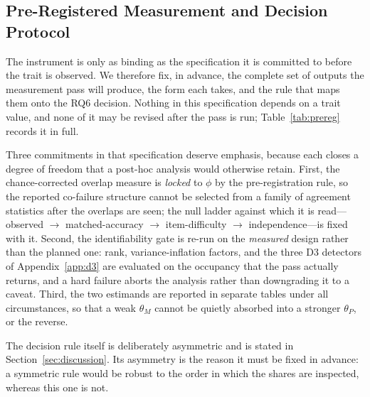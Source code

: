 \documentclass{ieeeaccess}
\theoremstyle{definition}
\theoremstyle{plain}
\begin{document}
\subsection{Pre-Registered Measurement and Decision Protocol}
\label{sec:methods-protocol}
The instrument is only as binding as the specification it is committed to
before the trait is observed. We therefore fix, in advance, the complete set of
outputs the measurement pass will produce, the form each takes, and the rule
that maps them onto the RQ6 decision. Nothing in this specification depends on
a trait value, and none of it may be revised after the pass is run;
Table~\ref{tab:prereg} records it in full.

Three commitments in that specification deserve emphasis, because each closes a
degree of freedom that a post-hoc analysis would otherwise retain. First, the
chance-corrected overlap measure is \emph{locked} to $\phi$ by the
pre-registration rule, so the reported co-failure structure cannot be selected
from a family of agreement statistics after the overlaps are seen; the null
ladder against which it is read---observed $\to$ matched-accuracy $\to$
item-difficulty $\to$ independence---is fixed with it. Second, the
identifiability gate is re-run on the \emph{measured} design rather than the
planned one: rank, variance-inflation factors, and the three D3 detectors of
Appendix~\ref{app:d3} are evaluated on the occupancy that the pass actually
returns, and a hard failure aborts the analysis rather than downgrading it to a
caveat. Third, the two estimands are reported in separate tables under all
circumstances, so that a weak $\theta_{M}$ cannot be quietly absorbed into a
stronger $\theta_{P}$, or the reverse.

The decision rule itself is deliberately asymmetric and is stated in
Section~\ref{sec:discussion}. Its asymmetry is the reason it must be fixed in
advance: a symmetric rule would be robust to the order in which the shares are
inspected, whereas this one is not.
\end{document}
